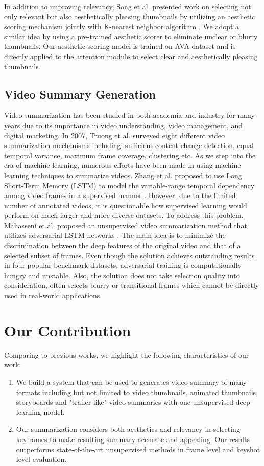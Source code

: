 \documentclass[5pt]{article}
\begin{document}
In addition to improving relevancy, Song et al. presented work on selecting not only relevant but also aesthetically pleasing thumbnails by utilizing an aesthetic scoring mechanism jointly with K-nearest neighbor algorithm \cite{song2016click}. We adopt a similar idea by using a pre-trained aesthetic scorer to eliminate unclear or blurry thumbnails. Our aesthetic scoring model is trained on AVA dataset and is directly applied to the attention module to select clear and aesthetically pleasing thumbnails.

\subsection{Video Summary Generation}
Video summarization has been studied in both academia and industry for many years due to its importance in video understanding, video management, and digital marketing.  In 2007, Truong et al. surveyed eight different video summarization mechanisms \cite{truong2007video} including: sufficient content change detection, equal temporal variance, maximum frame coverage, clustering etc. 
As we step into the era of machine learning, numerous efforts have been made in using machine learning techniques to summarize videos. Zhang et al. proposed to use Long Short-Term Memory (LSTM) to model the variable-range temporal dependency among video frames in a supervised manner \cite{zhang2016video}. However, due to the limited number of annotated videos, it is questionable how supervised learning would perform on much larger and more diverse datasets. To address this problem, Mahasseni et al. proposed an unsupervised video summarization method that utilizes adversarial LSTM networks \cite{mahasseni2017unsupervised}. The main idea is to minimize the discrimination between the deep features of the original video and that of a selected subset of frames. Even though the solution achieves outstanding results in four popular benchmark datasets, adversarial training is computationally hungry and unstable. Also, the solution does not take selection quality into consideration, often selects blurry or transitional frames which cannot be directly used in real-world applications.

\section{Our Contribution}
Comparing to previous works, we highlight the following characteristics of our work:
\begin{enumerate}
\item We build a system that can be used to generates video summary of many formats including but not limited to video thumbnails, animated thumbnails, storyboards and "trailer-like" video summaries with one unsupervised deep learning model.
\item Our summarization considers both aesthetics and relevancy in selecting keyframes to make resulting summary accurate and appealing. Our results outperforms state-of-the-art unsupervised methods in frame level and keyshot level evaluation.
\end{enumerate}
\end{document}
